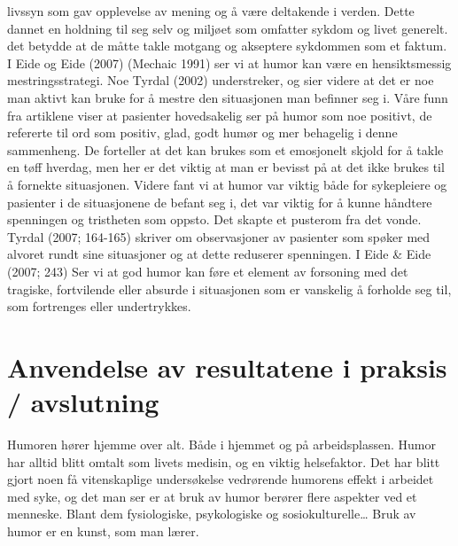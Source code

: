 livssyn som gav opplevelse av mening og å være deltakende i verden. Dette
dannet en holdning til seg selv og miljøet som omfatter sykdom og livet
generelt. det betydde at de måtte takle motgang og akseptere sykdommen som et
faktum. I Eide og Eide (2007) (Mechaic 1991) ser vi at humor kan være en
hensiktsmessig mestringsstrategi. Noe Tyrdal (2002) understreker, og sier
videre at det er noe man aktivt kan bruke for å mestre den situasjonen man
befinner seg i. Våre funn fra artiklene viser at pasienter hovedsakelig ser på
humor som noe positivt, de refererte til ord som positiv, glad, godt humør og
mer behagelig i denne sammenheng. De forteller at det kan brukes som et
emosjonelt skjold for å takle en tøff hverdag, men her er det viktig at man er
bevisst på at det ikke brukes til å fornekte situasjonen. Videre fant vi at
humor var viktig både for sykepleiere og pasienter i de situasjonene de befant
seg i, det var viktig for å kunne håndtere spenningen og tristheten som oppsto.
Det skapte et pusterom fra det vonde. Tyrdal (2007; 164-165) skriver om
observasjoner av pasienter som spøker med alvoret rundt sine situasjoner og at
dette reduserer spenningen. I Eide \&{} Eide (2007; 243) Ser vi at god humor kan
føre et element av forsoning med det tragiske, fortvilende eller absurde i
situasjonen som er vanskelig å forholde seg til, som fortrenges eller
undertrykkes.

\chapter{Anvendelse av resultatene i praksis / avslutning}

Humoren hører hjemme over alt. Både i hjemmet og på arbeidsplassen. Humor har
alltid blitt omtalt som livets medisin, og en viktig helsefaktor. Det har blitt
gjort noen få vitenskaplige undersøkelse vedrørende humorens effekt i arbeidet
med syke, og det man ser er at bruk av humor berører flere aspekter ved et
menneske. Blant dem fysiologiske, psykologiske og sosiokulturelle… Bruk av
humor er en kunst, som man lærer.
